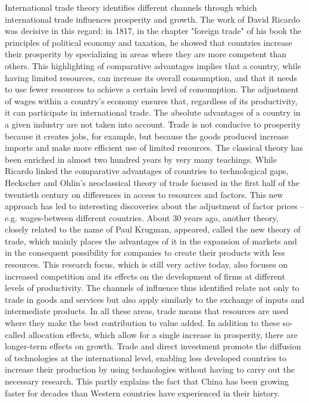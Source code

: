\documentclass[12pt]{article}
\begin{document}
International trade theory identifies different channels through which international trade influences prosperity and growth. The work of David Ricardo was decisive in this regard: in 1817, in the chapter "foreign trade" of his book the principles of political economy and taxation, he showed that countries increase their prosperity by specializing in areas where they are more competent than others. This highlighting of comparative advantages implies that a country, while having limited resources, can increase its overall consumption, and that it needs to use fewer resources to achieve a certain level of consumption. The adjustment of wages within a country's economy ensures that, regardless of its productivity, it can participate in international trade. The absolute advantages of a country in a given industry are not taken into account. Trade is not conducive to prosperity because it creates jobs, for example, but because the goods produced increase imports and make more efficient use of limited resources. The classical theory has been enriched in almost two hundred years by very many teachings. While Ricardo linked the comparative advantages of countries to technological gaps, Heckscher and Ohlin's neoclassical theory of trade focused in the first half of the twentieth century on differences in access to resources and factors. This new approach has led to interesting discoveries about the adjustment of factor prices – e.g. wages-between different countries. About 30 years ago, another theory, closely related to the name of Paul Krugman, appeared, called the new theory of trade, which mainly places the advantages of it in the expansion of markets and in the consequent possibility for companies to create their products with less resources. This research focus, which is still very active today, also focuses on increased competition and its effects on the development of firms at different levels of productivity. The channels of influence thus identified relate not only to trade in goods and services but also apply similarly to the exchange of inputs and intermediate products. In all these areas, trade means that resources are used where they make the best contribution to value added. In addition to these so-called allocation effects, which allow for a single increase in prosperity, there are longer-term effects on growth. Trade and direct investment promote the diffusion of technologies at the international level, enabling less developed countries to increase their production by using technologies without having to carry out the necessary research. This partly explains the fact that China has been growing faster for decades than Western countries have experienced in their history.
\end{document}
